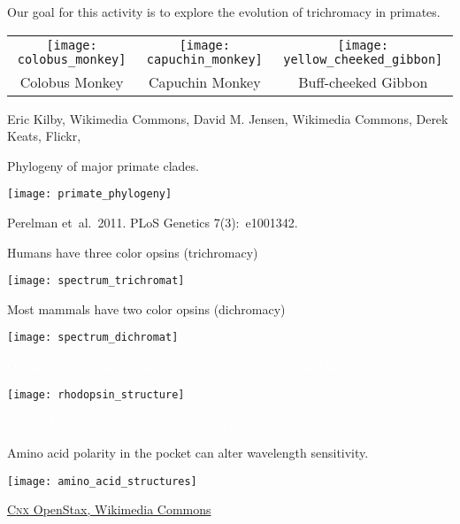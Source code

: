 \documentclass[t]{beamer}
\begin{document}
%
%
\begin{frame}{Our goal for this activity is to explore the evolution of trichromacy in primates.}
	
	\begin{tabular}{ccc}
	\texttt{[image: colobus\_monkey]} &
	\texttt{[image: capuchin\_monkey]} &
	\texttt{[image: yellow\_cheeked\_gibbon]} \tabularnewline
	Colobus Monkey & Capuchin Monkey & Buff-cheeked Gibbon \tabularnewline
	\end{tabular}
		
	\vfilll
	
	\tiny Eric Kilby, Wikimedia Commons,  \hfill
	David M. Jensen, Wikimedia Commons, \hfill
	Derek Keats, Flickr, 
\end{frame}
% 
\begin{frame}{Phylogeny of major primate clades.}


\texttt{[image: primate\_phylogeny]}

\vfilll

\hfill \tiny Perelman et~al.~2011. PLoS Genetics 7(3):~e1001342.

\end{frame}
%
\begin{frame}[t]{Humans have three color opsins (trichromacy)}
	
	\texttt{[image: spectrum\_trichromat]}
	
\end{frame}
%
\begin{frame}[t]{Most mammals have two color opsins (dichromacy)}
	
	\texttt{[image: spectrum\_dichromat]}
	
\end{frame}
%
{
\begin{frame}{\textcolor{white}{Opsins have an amino acid “pocket” surrounding a retinal molecule.}}
\vspace{-1.5\baselineskip}
{\centering
\texttt{[image: rhodopsin\_structure]}
\par}
\vfilll
\hfill \tiny \textcolor{white}{Roland Deschain, Wikimedia Commons, public domain}
\end{frame}
}
%
\begin{frame}{Amino acid polarity in the pocket can alter wavelength sensitivity.}

\vspace{-0.5\baselineskip}
{\centering
\texttt{[image: amino\_acid\_structures]}\par}

\vfilll

\hfill \tiny \href{https://commons.wikimedia.org/wiki/File:Figure_03_04_02.jpg}{C\textsc{nx} OpenStax, Wikimedia Commons} 
\end{frame}
\end{document}
